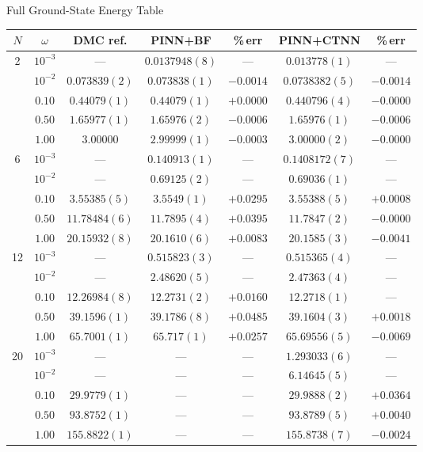 \documentclass[aspectratio=169,10pt]{beamer}
\begin{document}
\begin{frame}[allowframebreaks]{Full Ground-State Energy Table}
  \scriptsize
  \renewcommand{\arraystretch}{1.15}
  \begin{tabular}{c|c|c|cc|cc}
    \toprule
    $N$ & $\omega$ & DMC ref. & PINN+BF & \%\,err & PINN+CTNN & \%\,err \\
    \midrule
    2 & $10^{-3}$ & ---            & $0.0137948(8)$ & ---        & $0.013778(1)$    & ---      \\
      & $10^{-2}$ & $0.073839(2)$  & $0.073838(1)$  & $-0.0014$ & $0.0738382(5)$   & $-0.0014$\\
      & $0.10$    & $0.44079(1)$   & $0.44079(1)$   & $+0.0000$ & $0.440796(4)$    & $-0.0000$\\
      & $0.50$    & $1.65977(1)$   & $1.65976(2)$   & $-0.0006$ & $1.65976(1)$     & $-0.0006$\\
      & $1.00$    & $3.00000$      & $2.99999(1)$   & $-0.0003$ & $3.00000(2)$     & $-0.0000$\\
    \midrule
    6 & $10^{-3}$ & ---            & $0.140913(1)$  & ---        & $0.1408172(7)$   & ---      \\
      & $10^{-2}$ & ---            & $0.69125(2)$   & ---        & $0.69036(1)$     & ---      \\
      & $0.10$    & $3.55385(5)$   & $3.5549(1)$    & $+0.0295$ & $3.55388(5)$     & $+0.0008$\\
      & $0.50$    & $11.78484(6)$  & $11.7895(4)$   & $+0.0395$ & $11.7847(2)$     & $-0.0000$\\
      & $1.00$    & $20.15932(8)$  & $20.1610(6)$   & $+0.0083$ & $20.1585(3)$     & $-0.0041$\\
    \midrule
    12& $10^{-3}$ & ---            & $0.515823(3)$  & ---        & $0.515365(4)$    & ---      \\
      & $10^{-2}$ & ---            & $2.48620(5)$   & ---        & $2.47363(4)$     & ---      \\
      & $0.10$    & $12.26984(8)$  & $12.2731(2)$   & $+0.0160$ & $12.2718(1)$     & ---      \\
      & $0.50$    & $39.1596(1)$   & $39.1786(8)$   & $+0.0485$ & $39.1604(3)$     & $+0.0018$\\
      & $1.00$    & $65.7001(1)$   & $65.717(1)$    & $+0.0257$ & $65.69556(5)$    & $-0.0069$\\
    \midrule
    20& $10^{-3}$ & ---            & ---            & ---        & $1.293033(6)$    & ---      \\
      & $10^{-2}$ & ---            & ---            & ---        & $6.14645(5)$     & ---      \\
      & $0.10$    & $29.9779(1)$   & ---            & ---        & $29.9888(2)$     & $+0.0364$\\
      & $0.50$    & $93.8752(1)$   & ---            & ---        & $93.8789(5)$     & $+0.0040$\\
      & $1.00$    & $155.8822(1)$  & ---            & ---        & $155.8738(7)$    & $-0.0024$\\
    \bottomrule
  \end{tabular}
\end{frame}
\end{document}
